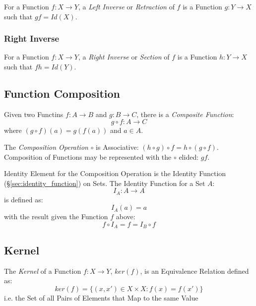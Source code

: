 For a Function $f: X \rightarrow Y$, a \emph{Left Inverse} or
\emph{Retraction} of $f$ is a Function $g: Y \rightarrow X$ such that
$gf = Id(X)$.



\subsubsection{Right Inverse}\label{sec:right_inverse}

For a Function $f: X \rightarrow Y$, a \emph{Right Inverse} or
\emph{Section} of $f$ is a Function $h: Y \rightarrow X$ such that $fh
= Id(Y)$.



\subsection{Function Composition}\label{sec:function_composition}

Given two Functins $f : A \rightarrow B$ and $g : B \rightarrow C$,
there is a \emph{Composite Function}:
\[
  g \circ f : A \rightarrow C
\]
where $(g \circ f)(a) = g(f(a))$ and $a \in A$.

The \emph{Composition Operation} $\circ$ is Associative: $(h \circ g)
\circ f = h \circ (g \circ f)$. Composition of Functions may be
represented with the $\circ$ elided: $gf$.

Identity Element for the Composition Operation is the Identity
Function (\S\ref{sec:identity_function}) on Sets. The Identity
Function for a Set $A$:
\[
  I_A : A \rightarrow A
\]
is defined as:
\[
  I_A(a) = a
\]
with the result given the Function $f$ above:
\[
  f \circ I_A = f = I_B \circ f
\]



\subsection{Kernel}\label{sec:function_kernel}

The \emph{Kernel} of a Function $f : X \rightarrow Y$, $ker(f)$, is an
Equivalence Relation defined as:
\[
  ker(f) = \{ (x,x') \in X \times X : f(x) = f(x') \}
\]
i.e. the Set of all Pairs of Elements that Map to the same Value



